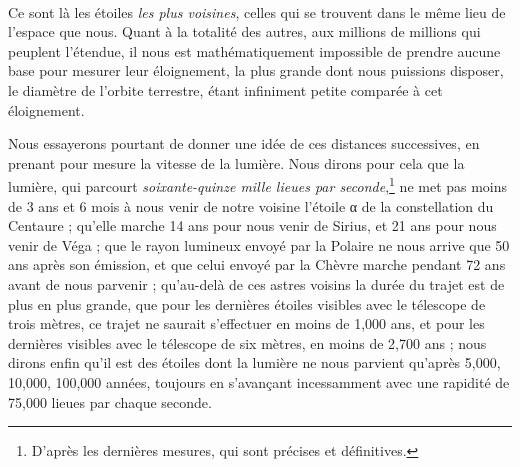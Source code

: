 \documentclass[a4paper, 11pt, oneside]{article}
\begin{document}
\paragraph{}
Ce sont là les étoiles \emph{les plus voisines}, celles qui se trouvent dans le même lieu de l'espace que nous. Quant à la totalité des autres, aux millions de millions qui peuplent l'étendue, il nous est mathématiquement impossible de prendre aucune base pour mesurer leur éloignement, la plus grande dont nous puissions disposer, le diamètre de l'orbite terrestre, étant infiniment petite comparée à cet éloignement.

Nous essayerons pourtant de donner une idée de ces distances successives, en prenant pour mesure la vitesse de la lumière. Nous dirons pour cela que la lumière, qui parcourt \emph{soixante-quinze mille lieues par seconde},\footnote{D'après les dernières mesures, qui sont précises et définitives.} ne met pas moins de 3 ans et 6 mois à nous venir de notre voisine l'étoile α de la constellation du Centaure ; qu'elle marche 14 ans pour nous venir de Sirius, et 21 ans pour nous venir de Véga ; que le rayon lumineux envoyé par la Polaire ne nous arrive que 50 ans après son émission, et que celui envoyé par la Chèvre marche pendant 72 ans avant de nous parvenir ; qu'au-delà de ces astres voisins la durée du trajet est de plus en plus grande, que pour les dernières étoiles visibles avec le télescope de trois mètres, ce trajet ne saurait s'effectuer en moins de 1,000 ans, et pour les dernières visibles avec le télescope de six mètres, en moins de 2,700 ans ; nous dirons enfin qu'il est des étoiles dont la lumière ne nous parvient qu'après 5,000, 10,000, 100,000 années, toujours en s'avançant incessamment avec une rapidité de 75,000 lieues par chaque seconde.
\end{document}
